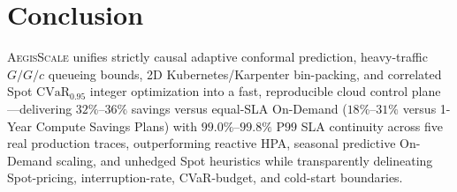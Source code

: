 \documentclass[journal]{IEEEtran}
\begin{document}
\section{Conclusion}
\textsc{AegisScale} unifies strictly causal adaptive conformal prediction, heavy-traffic $G/G/c$ queueing bounds, 2D Kubernetes/Karpenter bin-packing, and correlated Spot $\mathrm{CVaR}_{0.95}$ integer optimization into a fast, reproducible cloud control plane---delivering $32\%$--$36\%$ savings versus equal-SLA On-Demand ($18\%$--$31\%$ versus 1-Year Compute Savings Plans) with $99.0\%$--$99.8\%$ $\mathrm{P99}$ SLA continuity across five real production traces, outperforming reactive HPA, seasonal predictive On-Demand scaling, and unhedged Spot heuristics while transparently delineating Spot-pricing, interruption-rate, CVaR-budget, and cold-start boundaries.



\end{document}
